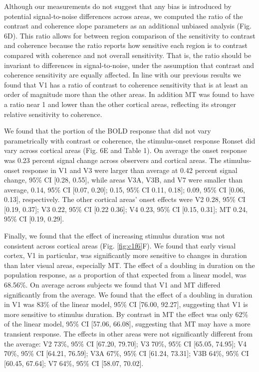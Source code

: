 \documentclass{report}
\begin{document}
Although our measurements do not suggest that any bias is introduced by potential signal-to-noise differences across areas, we computed the ratio of the contrast and coherence slope parameters as an additional unbiased analysis (Fig. 6D). This ratio allows for between region comparison of the sensitivity to contrast and coherence because the ratio reports how sensitive each region is to contrast compared with coherence and not overall sensitivity. That is, the ratio should be invariant to differences in signal-to-noise, under the assumption that contrast and coherence sensitivity are equally affected. In line with our previous results we found that V1 has a ratio of contrast to coherence sensitivity that is at least an order of magnitude more than the other areas. In addition MT was found to have a ratio near 1 and lower than the other cortical areas, reflecting its stronger relative sensitivity to coherence.

We found that the portion of the BOLD response that did not vary parametrically with contrast or coherence, the stimulus-onset response Ronset did vary across cortical areas (Fig. 6E and Table 1). On average the onset response was 0.23 percent signal change across observers and cortical areas. The stimulus-onset response in V1 and V3 were larger than average at 0.42 percent signal change, 95\% CI [0.28, 0.55], while areas V3A, V3B, and V7 were smaller than average, 0.14, 95\% CI [0.07, 0.20]; 0.15, 95\% CI 0.11, 0.18]; 0.09, 95\% CI [0.06, 0.13], respectively. The other cortical areas’ onset effects were V2 0.28, 95\% CI [0.19, 0.37]; V3 0.22, 95\% CI [0.22 0.36]; V4 0.23, 95\% CI [0.15, 0.31]; MT 0.24, 95\% CI [0.19, 0.29].

Finally, we found that the effect of increasing stimulus duration was not consistent across cortical areas (Fig. \ref{fig:c1f6}F). We found that early visual cortex, V1 in particular, was significantly more sensitive to changes in duration than later visual areas, especially MT. The effect of a doubling in duration on the population response, as a proportion of that expected from a linear model, was 68.56\%. On average across subjects we found that V1 and MT differed significantly from the average. We found that the effect of a doubling in duration in V1 was 83\% of the linear model, 95\% CI [76.00, 92.27], suggesting that V1 is more sensitive to stimulus duration. By contrast in MT the effect was only 62\% of the linear model, 95\% CI [57.06, 66.08], suggesting that MT may have a more transient response. The effects in other areas were not significantly different from the average: V2 73\%, 95\% CI [67.20, 79.70]; V3 70\%, 95\% CI [65.05, 74.95]; V4 70\%, 95\% CI [64.21, 76.59]; V3A 67\%, 95\% CI [61.24, 73.31]; V3B 64\%, 95\% CI [60.45, 67.64]; V7 64\%, 95\% CI [58.07, 70.02].
\end{document}
